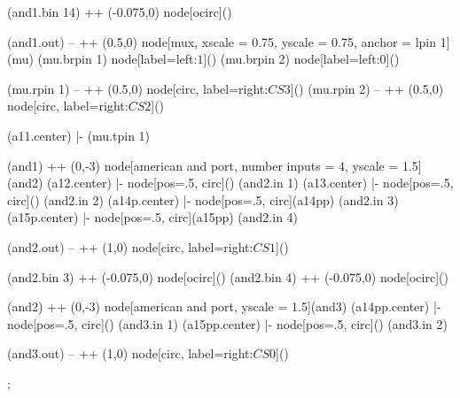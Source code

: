 \begin{page}
\begin{circuitikz}
		(and1.bin 14) ++ (-0.075,0) node[ocirc](){}
		
	
		(and1.out) -- ++ (0.5,0) node[mux, xscale = 0.75, yscale = 0.75, anchor = lpin 1](mu){}
		(mu.brpin 1) node[label=left:$1$](){}
		(mu.brpin 2) node[label=left:$0$](){}
		
		(mu.rpin 1) -- ++ (0.5,0) node[circ, label=right:$CS3$](){}
		(mu.rpin 2) -- ++ (0.5,0) node[circ, label=right:$CS2$](){}
		
		(a11.center) |- (mu.tpin 1)
		
		
		(and1) ++ (0,-3) node[american and port, number inputs = 4, yscale = 1.5](and2){}
		(a12.center) |- node[pos=.5, circ](){} (and2.in 1)
		(a13.center) |- node[pos=.5, circ](){} (and2.in 2)
		(a14p.center) |- node[pos=.5, circ](a14pp){} (and2.in 3)
		(a15p.center) |- node[pos=.5, circ](a15pp){} (and2.in 4)
		
		(and2.out) -- ++ (1,0) node[circ, label=right:$CS1$](){}
		
		(and2.bin 3) ++ (-0.075,0) node[ocirc](){}
		(and2.bin 4) ++ (-0.075,0) node[ocirc](){}
		
		(and2) ++ (0,-3) node[american and port, yscale = 1.5](and3){}
		(a14pp.center) |- node[pos=.5, circ](){} (and3.in 1)
		(a15pp.center) |- node[pos=.5, circ](){} (and3.in 2)
		
		(and3.out) -- ++ (1,0) node[circ, label=right:$CS0$](){}
		
		
		
		
		

		
		
		
			
		
	;

%	

\end{circuitikz}
\end{page}





